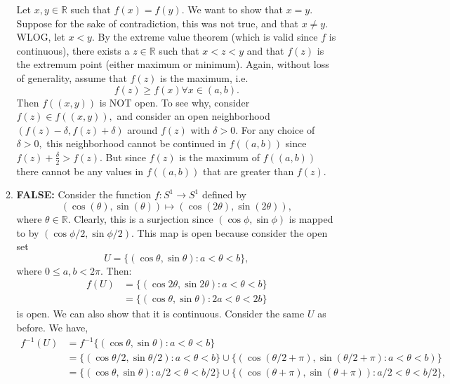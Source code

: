 \documentclass{article}
\numberwithin{equation}{section}
\begin{document}
\begin{enumerate}
\begin{enumerate}[label=(\alph*)]
         Let $x,y\in \mathbb{R}$ such that $f(x)=f(y).$ We want to show that $x=y.$ Suppose for the sake of contradiction, this was not true, and that $x\neq y.$ WLOG, let $x<y.$ By the extreme value theorem (which is valid since $f$ is continuous), there exists a $z\in \mathbb{R}$ such that $x<z<y$ and that $f(z)$ is the extremum point (either maximum or minimum). Again, without loss of generality, assume that $f(z)$ is the maximum, i.e. 
         \begin{equation*}
            f(z) \ge f(x) \forall x \in (a,b).
         \end{equation*}
         Then $f((x,y))$ is NOT open. To see why, consider $f(z) \in f((x,y)),$ and consider an open neighborhood $(f(z)-\delta,f(z)+\delta)$ around $f(z)$ with $\delta > 0.$ For any choice of $\delta > 0,$ this neighborhood cannot be continued in $f((a,b))$ since $f(z) + \frac{\delta}{2} > f(z).$ But since $f(z)$ is the maximum of $f((a,b))$ there cannot be any values in $f((a,b))$ that are greater than $f(z).$
         \item \textbf{FALSE:} Consider the function $f:S^1 \to S^1$ defined by 
         \begin{equation*}
            (\cos(\theta),\sin(\theta)) \mapsto (\cos(2\theta),\sin(2\theta)),
         \end{equation*}
         where $\theta \in \mathbb{R}.$ Clearly, this is a surjection since $(\cos \phi,\sin\phi)$ is mapped to by $(\cos \phi/2,\sin \phi/2).$ This map is open because consider the open set 
         \begin{equation*}
            U = \{(\cos\theta,\sin\theta):a < \theta < b\},
         \end{equation*}
         where $0 \le a,b < 2\pi.$ Then:
         \begin{align*}
            f(U) &= \{(\cos 2\theta,\sin 2\theta):a < \theta < b\} \\ 
            &= \{(\cos \theta,\sin\theta): 2a < \theta < 2b\}
         \end{align*}
         is open. We can also show that it is continuous. Consider the same $U$ as before. We have,
         \begin{align*}
            f^{-1}(U) &= f^{-1}\{(\cos \theta,\sin\theta): a < \theta < b\} \\ 
            &= \{(\cos \theta/2,\sin\theta/2):a < \theta < b\}  \cup \{(\cos(\theta/2 + \pi), \sin(\theta/2+\pi):a < \theta < b)\} \\ 
            &= \{(\cos\theta,\sin\theta):a/2<\theta<b/2\} \cup \{(\cos(\theta+\pi),\sin(\theta+\pi)):a/2<\theta<b/2\},

\end{align*}
\end{enumerate}
\end{enumerate}
\end{document}

